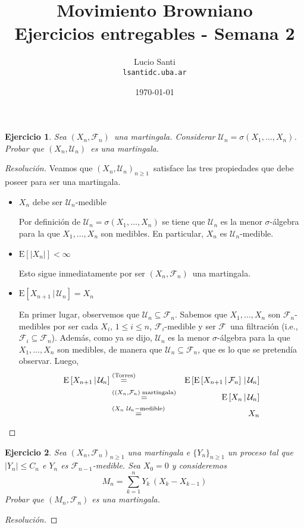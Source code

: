 \documentclass[a4paper,11pt]{article}
\title{Movimiento Browniano\\
      \small{Ejercicios entregables - Semana 2}}
\author{Lucio Santi\\
        \texttt{lsanti\at dc.uba.ar}}
\date{\today}
\newcommand{\abs}[1]{\ensuremath{\left\lvert #1 \right\rvert}}
\newcommand{\Sig}[1]{\ensuremath{\mathcal{#1}}}
\newcommand{\SigAlg}[1]{\ensuremath{\sigma\left(#1\right)}}
\newcommand{\Mart}[2]{\ensuremath{\left(#1_n, \Sig{#2}_n\right)}}
\newcommand{\Exp}[1]{\ensuremath{\textrm{E}\left[#1\right]}}
\newcommand{\ExpC}[2]{\ensuremath{\textrm{E}\left[#1 \, | \, #2\right]}}
\newtheorem*{ej}{Ejercicio}
\begin{document}
\maketitle

\begin{ej} 
    Sea \Mart{X}{F}~una martingala. Considerar $\Sig{U}_n = \SigAlg{X_1, \dots, X_n}$.
    Probar que \Mart{X}{U}~es una martingala.
\end{ej}

\begin{proof}[Resoluci\'on]
Veamos que $\Mart{X}{U}_{n \geq 1}$~satisface las tres propiedades que debe poseer
para ser una martingala. 

\begin{itemize}
    \item $X_n$ debe ser $\Sig{U}_n$-medible

    Por definición de $\Sig{U}_n = \SigAlg{X_1, \dots, X_n}$ se tiene que $\Sig{U}_n$
    es la menor $\sigma$-álgebra para la que $X_1,\dots,X_n$ son medibles. En
    particular, $X_n$ es $\Sig{U}_n$-medible.

    \item $\Exp{\abs{X_n}} < \infty$

    Esto sigue inmediatamente por ser \Mart{X}{F}~una martingala.

    \item $\ExpC{X_{n+1}}{\Sig{U}_n} = X_n$

    En primer lugar, observemos que $\Sig{U}_n \subseteq \Sig{F}_n$. Sabemos que
    $X_1,\dots,X_n$ son $\Sig{F}_n$-medibles por ser cada $X_i$, $1 \leq i \leq n$,
    $\Sig{F}_i$-medible y ser \Sig{F}~una filtración (i.e.,
    $\Sig{F}_i \subseteq \Sig{F}_n$). Además, como ya se dijo, $\Sig{U}_n$ es la
    menor $\sigma$-álgebra para la que $X_1,\dots,X_n$ son medibles, de manera que
    $\Sig{U}_n \subseteq \Sig{F}_n$, que es lo que se pretendía observar. Luego,
    \begin{eqnarray*}
        \ExpC{X_{n+1}}{\Sig{U}_n} &\overset{\tiny{\textrm{(Torres)}}}{=}&
            \ExpC{ \ExpC{X_{n+1}}{\Sig{F}_n} }{\Sig{U}_n} \\
        &\overset{\tiny{(\Mart{X}{F}~\textrm{martingala})}}{=}&
            \ExpC{X_n}{\Sig{U}_n} \\
        &\overset{\tiny{(X_n \,\, \Sig{U}_n-\textrm{medible}})}{=}&
            X_n
    \end{eqnarray*}
\end{itemize}

\end{proof}


\begin{ej}
    Sea $(X_n, \Sig{F}_n)_{n \geq 1}$ una martingala e $\{Y_n\}_{n \geq 1}$ un proceso tal
    que $\abs{Y_n} \leq C_n$ e $Y_n$ es $\Sig{F}_{n−1}$-medible. Sea $X_0 = 0$ y consideremos
    $$M_n = \displaystyle \sum_{k = 1}^{n}{Y_k \, (X_k − X_{k−1})}$$
    Probar que $(M_n, \Sig{F}_n)$ es una martingala. 
\end{ej}

\begin{proof}[Resoluci\'on]

\end{proof}
\end{document}
